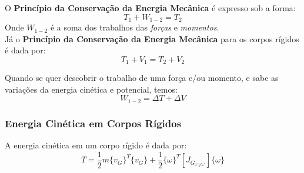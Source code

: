 \documentclass[a4paper, 12pt]{article}
\begin{document}
	O \textbf{Princípio da Conservação da Energia Mecânica} é expresso sob a forma:
	\begin{equation}
		T_1 + W_{1-2} = T_2
	\end{equation}
	Onde $W_{1-2}$ é a soma dos trabalhos das \textit{forças} e \textit{momentos}.\\
	
	Já o \textbf{Princípio da Conservação da Energia Mecânica} para os corpos rígidos é dada por:
	\begin{equation}
		T_1 + V_1 = T_2 + V_2
	\end{equation}
	
	Quando se quer descobrir o trabalho de uma força e/ou momento, e sabe as variações da energia cinética e potencial, temos:
	\begin{equation}
		W_{1-2} = \Delta T + \Delta V 
\end{equation}		
	
	\subsubsection{Energia Cinética em Corpos Rígidos}
	A energia cinética em um corpo rígido é dada por:
	\begin{equation}
		T = \frac{1}{2}	m\{v_G\}^T\{v_G\} + \frac{1}{2}\{\omega \}^T[J_{G_{x'y'z'}}]\{\omega \}
	\end{equation}
\end{document}
